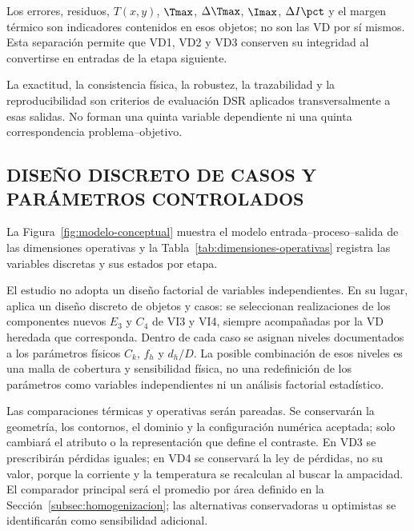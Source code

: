 Los errores, residuos, $T(x,y)$, $\Tmax$, $\Delta\Tmax$, $\Imax$, $\Delta I\pct$ y el margen térmico son indicadores contenidos en esos objetos; no son las VD por sí mismos. Esta separación permite que VD1, VD2 y VD3 conserven su integridad al convertirse en entradas de la etapa siguiente.

La exactitud, la consistencia física, la robustez, la trazabilidad y la reproducibilidad son criterios de evaluación DSR aplicados transversalmente a esas salidas. No forman una quinta variable dependiente ni una quinta correspondencia problema--objetivo.

\subsection{DISEÑO DISCRETO DE CASOS Y PARÁMETROS CONTROLADOS}

La Figura~\ref{fig:modelo-conceptual} muestra el modelo entrada--proceso--salida de las dimensiones operativas y la Tabla~\ref{tab:dimensiones-operativas} registra las variables discretas y sus estados por etapa.

El estudio no adopta un diseño factorial de variables independientes. En su lugar, aplica un diseño discreto de objetos y casos: se seleccionan realizaciones de los componentes nuevos $E_3$ y $C_4$ de VI3 y VI4, siempre acompañadas por la VD heredada que corresponda. Dentro de cada caso se asignan niveles documentados a los parámetros físicos $C_k$, $f_h$ y $d_h/D$. La posible combinación de esos niveles es una malla de cobertura y sensibilidad física, no una redefinición de los parámetros como variables independientes ni un análisis factorial estadístico.

Las comparaciones térmicas y operativas serán pareadas. Se conservarán la geometría, los contornos, el dominio y la configuración numérica aceptada; solo cambiará el atributo o la representación que define el contraste. En VD3 se prescribirán pérdidas iguales; en VD4 se conservará la ley de pérdidas, no su valor, porque la corriente y la temperatura se recalculan al buscar la ampacidad. El comparador principal será el promedio por área definido en la Sección~\ref{subsec:homogenizacion}; las alternativas conservadoras u optimistas se identificarán como sensibilidad adicional.

